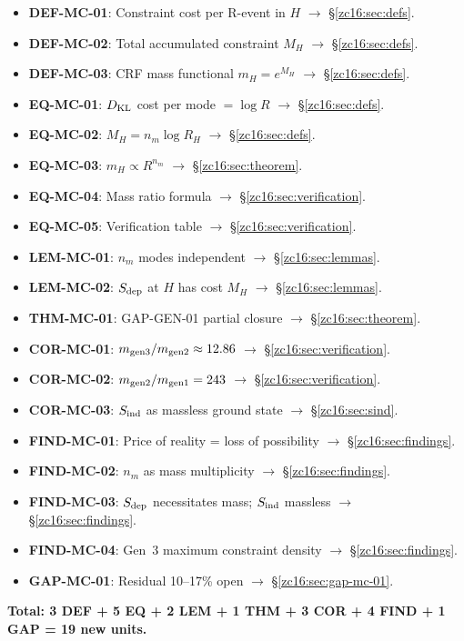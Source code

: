 \documentclass[12pt, a4paper]{article}
\begin{document}
\begin{formalbox}[title={Atomic units introduced by TASK-ZC16
  (14 new units)}]
\begin{itemize}[leftmargin=*]
  \item \textbf{DEF-MC-01}: Constraint cost per R-event in $H$
    $\to$ \S\ref{zc16:sec:defs}.
  \item \textbf{DEF-MC-02}: Total accumulated constraint $M_H$
    $\to$ \S\ref{zc16:sec:defs}.
  \item \textbf{DEF-MC-03}: CRF mass functional $m_H = e^{M_H}$
    $\to$ \S\ref{zc16:sec:defs}.
  \item \textbf{EQ-MC-01}: $D_{\rm KL}$ cost per mode $= \log R$
    $\to$ \S\ref{zc16:sec:defs}.
  \item \textbf{EQ-MC-02}: $M_H = n_m \log R_H$
    $\to$ \S\ref{zc16:sec:defs}.
  \item \textbf{EQ-MC-03}: $m_H \propto R^{n_m}$
    $\to$ \S\ref{zc16:sec:theorem}.
  \item \textbf{EQ-MC-04}: Mass ratio formula
    $\to$ \S\ref{zc16:sec:verification}.
  \item \textbf{EQ-MC-05}: Verification table
    $\to$ \S\ref{zc16:sec:verification}.
  \item \textbf{LEM-MC-01}: $n_m$ modes independent
    $\to$ \S\ref{zc16:sec:lemmas}.
  \item \textbf{LEM-MC-02}: $S_{\rm dep}$ at $H$ has cost $M_H$
    $\to$ \S\ref{zc16:sec:lemmas}.
  \item \textbf{THM-MC-01}: GAP-GEN-01 partial closure
    $\to$ \S\ref{zc16:sec:theorem}.
  \item \textbf{COR-MC-01}: $m_{\rm gen3}/m_{\rm gen2} \approx 12.86$
    $\to$ \S\ref{zc16:sec:verification}.
  \item \textbf{COR-MC-02}: $m_{\rm gen2}/m_{\rm gen1} = 243$
    $\to$ \S\ref{zc16:sec:verification}.
  \item \textbf{COR-MC-03}: $S_{\rm ind}$ as massless ground state
    $\to$ \S\ref{zc16:sec:sind}.
  \item \textbf{FIND-MC-01}: Price of reality = loss of possibility
    $\to$ \S\ref{zc16:sec:findings}.
  \item \textbf{FIND-MC-02}: $n_m$ as mass multiplicity
    $\to$ \S\ref{zc16:sec:findings}.
  \item \textbf{FIND-MC-03}: $S_{\rm dep}$ necessitates mass;
    $S_{\rm ind}$ massless $\to$ \S\ref{zc16:sec:findings}.
  \item \textbf{FIND-MC-04}: Gen~3 maximum constraint density
    $\to$ \S\ref{zc16:sec:findings}.
  \item \textbf{GAP-MC-01}: Residual 10--17\% open
    $\to$ \S\ref{zc16:sec:gap-mc-01}.
\end{itemize}
\textbf{Total: 3 DEF + 5 EQ + 2 LEM + 1 THM + 3 COR
+ 4 FIND + 1 GAP = 19 new units.}
\end{formalbox}
\end{document}
